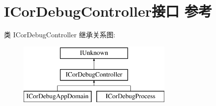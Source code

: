 \hypertarget{interface_i_cor_debug_controller}{}\section{I\+Cor\+Debug\+Controller接口 参考}
\label{interface_i_cor_debug_controller}
类 I\+Cor\+Debug\+Controller 继承关系图\+:\begin{figure}[H]
\begin{center}
\leavevmode
\includegraphics[height=3.000000cm]{interface_i_cor_debug_controller}
\end{center}
\end{figure}
